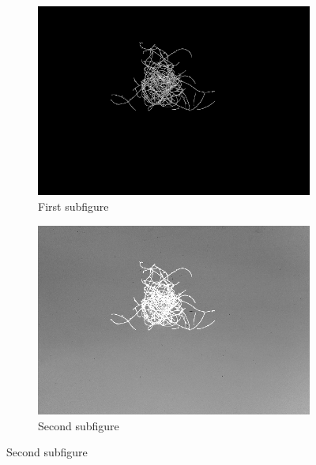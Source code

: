 \documentclass[german,a4paper, 12pt]{scrartcl}
\begin{document}
\begin{figure}[H] %
	\begin{subfigure}{0.48\textwidth}
		\includegraphics[width=\linewidth]{figBina/06small regions removed.png}
		\caption{First subfigure} \label{fig:a}
	\end{subfigure}\hspace*{\fill}
	\begin{subfigure}{0.48\textwidth}
		\includegraphics[width=\linewidth]{figBina/07missed hair.png}
		\caption{Second subfigure} \label{fig:b}
	\end{subfigure}
	

\end{figure}
\end{document}
